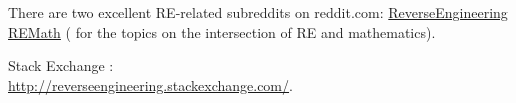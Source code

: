 {There are two excellent \ac{RE}-related subreddits on reddit.com}: 
\href{http://www.reddit.com/r/ReverseEngineering/}{ReverseEngineering} \AndENRU 
\href{http://www.reddit.com/r/remath}{REMath}
(
{for the topics on the intersection of \ac{RE} and mathematics}).

 Stack Exchange 
:\\
\url{http://reverseengineering.stackexchange.com/}.
